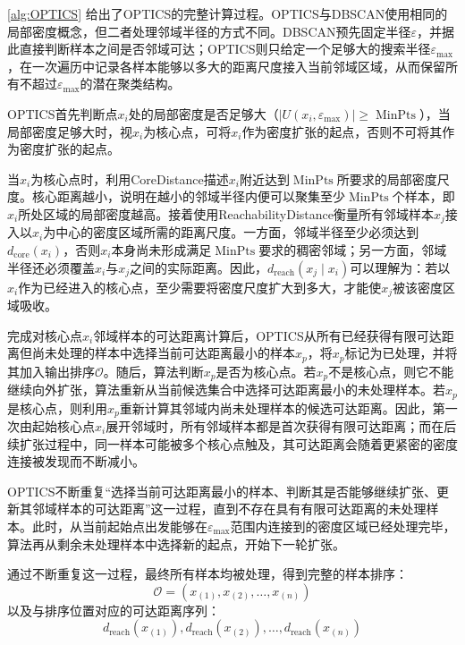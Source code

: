 \cref{alg:OPTICS} 给出了OPTICS的完整计算过程。OPTICS与DBSCAN使用相同的局部密度概念，但二者处理邻域半径的方式不同。DBSCAN预先固定半径$\varepsilon$，并据此直接判断样本之间是否邻域可达；OPTICS则只给定一个足够大的搜索半径$\varepsilon_{\max}$，在一次遍历中记录各样本能够以多大的距离尺度接入当前邻域区域，从而保留所有不超过$\varepsilon_{\max}$的潜在聚类结构。\par
OPTICS首先判断点$x_i$处的局部密度是否足够大（$|U(x_i,\varepsilon_{\max})|\geqslant\operatorname{MinPts}$），当局部密度足够大时，视$x_i$为核心点，可将$x_i$作为密度扩张的起点，否则不可将其作为密度扩张的起点。\par
当$x_i$为核心点时，利用\gls{CoreDistance}描述$x_i$附近达到$\operatorname{MinPts}$所要求的局部密度尺度。核心距离越小，说明在越小的邻域半径内便可以聚集至少$\operatorname{MinPts}$个样本，即$x_i$所处区域的局部密度越高。接着使用\gls{ReachabilityDistance}衡量所有邻域样本$x_j$接入以$x_i$为中心的密度区域所需的距离尺度。一方面，邻域半径至少必须达到$d_{\mathrm{core}}(x_i)$，否则$x_i$本身尚未形成满足$\operatorname{MinPts}$要求的稠密邻域；另一方面，邻域半径还必须覆盖$x_i$与$x_j$之间的实际距离。因此，$d_{\mathrm{reach}}(x_j\mid x_i)$可以理解为：若以$x_i$作为已经进入的核心点，至少需要将密度尺度扩大到多大，才能使$x_j$被该密度区域吸收。\par
完成对核心点$x_i$邻域样本的可达距离计算后，OPTICS从所有已经获得有限可达距离但尚未处理的样本中选择当前可达距离最小的样本$x_p$，将$x_p$标记为已处理，并将其加入输出排序$\mathcal{O}$。随后，算法判断$x_p$是否为核心点。若$x_p$不是核心点，则它不能继续向外扩张，算法重新从当前候选集合中选择可达距离最小的未处理样本。若$x_p$是核心点，则利用$x_p$重新计算其邻域内尚未处理样本的候选可达距离。因此，第一次由起始核心点$x_i$展开邻域时，所有邻域样本都是首次获得有限可达距离；而在后续扩张过程中，同一样本可能被多个核心点触及，其可达距离会随着更紧密的密度连接被发现而不断减小。\par
OPTICS不断重复“选择当前可达距离最小的样本、判断其是否能够继续扩张、更新其邻域样本的可达距离”这一过程，直到不存在具有有限可达距离的未处理样本。此时，从当前起始点出发能够在$\varepsilon_{\max}$范围内连接到的密度区域已经处理完毕，算法再从剩余未处理样本中选择新的起点，开始下一轮扩张。\par
通过不断重复这一过程，最终所有样本均被处理，得到完整的样本排序：
\begin{equation*}
	\mathcal{O}=\left(x_{(1)},x_{(2)},\dots,x_{(n)}\right)
\end{equation*}
以及与排序位置对应的可达距离序列：
\begin{equation*}
	d_{\mathrm{reach}}(x_{(1)}),d_{\mathrm{reach}}(x_{(2)}),\dots,d_{\mathrm{reach}}(x_{(n)})
\end{equation*}

